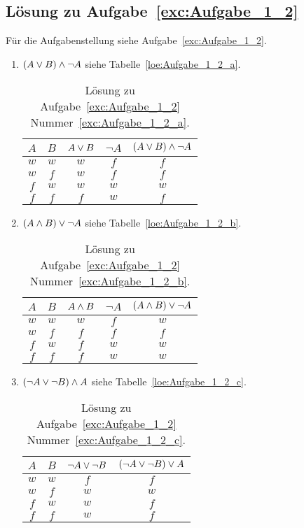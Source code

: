 \subsection{Lösung zu Aufgabe~\ref{exc:Aufgabe_1_2}}
Für die Aufgabenstellung siehe Aufgabe~\vref{exc:Aufgabe_1_2}.
\label{loe:Aufgabe_1_2}
\begin{enumerate}
\item $\left(A \vee B\right) \wedge \neg A$ siehe Tabelle~\vref{loe:Aufgabe_1_2_a}.
	\begin{table}[htb]
	\center
	\begin{tabular}{c|c||c|c|c}
	$A$ & $B$ & $A \vee B$ & $\neg A$ & $\left(A \vee B\right) \wedge \neg A$\\\hline
	$w$ & $w$ & $w$ & $f$ & $f$\\
	$w$ & $f$ & $w$ & $f$ & $f$\\
	$f$ & $w$ & $w$ & $w$ & $w$\\
	$f$ & $f$ & $f$ & $w$ & $f$\\
	\end{tabular}
	\caption{Lösung zu Aufgabe~\ref{exc:Aufgabe_1_2} Nummer~\ref{exc:Aufgabe_1_2_a}.}
	\label{loe:Aufgabe_1_2_a}
	\end{table}
\item $\left(A \wedge B\right) \vee \neg A$ siehe Tabelle~\vref{loe:Aufgabe_1_2_b}.
	\begin{table}[htb]
	\center
	\begin{tabular}{c|c||c|c|c}
	$A$ & $B$ & $A \wedge B$ & $\neg A$ & $\left(A \wedge B\right) \vee \neg A$\\\hline
	$w$ & $w$ & $w$ & $f$ & $w$\\
	$w$ & $f$ & $f$ & $f$ & $f$\\
	$f$ & $w$ & $f$ & $w$ & $w$\\
	$f$ & $f$ & $f$ & $w$ & $w$\\
	\end{tabular}
	\caption{Lösung zu Aufgabe~\ref{exc:Aufgabe_1_2} Nummer~\ref{exc:Aufgabe_1_2_b}.}
	\label{loe:Aufgabe_1_2_b}
	\end{table}
\item $\left(\neg A \vee \neg B\right) \wedge A$ siehe Tabelle~\vref{loe:Aufgabe_1_2_c}.
	\begin{table}[htb]
	\center
	\begin{tabular}{c|c||c|c}
	$A$ & $B$ & $\neg A \vee \neg B$ & $\left(\neg A \vee \neg B\right) \vee A$\\\hline
	$w$ & $w$ & $f$ & $f$\\
	$w$ & $f$ & $w$ & $w$\\
	$f$ & $w$ & $w$ & $f$\\
	$f$ & $f$ & $w$ & $f$\\
	\end{tabular}
	\caption{Lösung zu Aufgabe~\ref{exc:Aufgabe_1_2} Nummer~\ref{exc:Aufgabe_1_2_c}.}
	\label{loe:Aufgabe_1_2_c}
	\end{table}
\end{enumerate}

